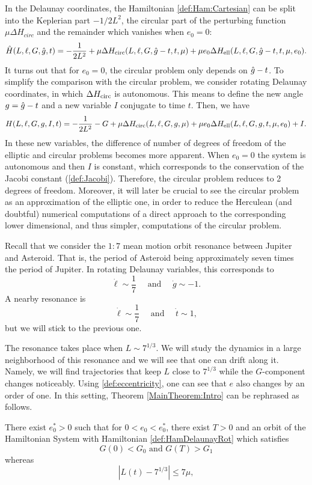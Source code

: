 In the Delaunay coordinates, the Hamiltonian \eqref{def:Ham:Cartesian}
can be split into the Keplerian part $-1/2L^2$, the circular part of
the perturbing function $\mu \Delta H_{circ}$ and the remainder which
vanishes when $e_0=0$:
\begin{equation}\label{def:HamDelaunayNonRot}
  \hat H(L,\ell,G, \hat g,t)=-\frac{1}{2L^2}+\mu\Delta H_{\mathrm{circ}}(L,\ell,G,
  \hat g-t,t,\mu)+ \mu e_0\Delta H_{\mathrm{ell}}(L,\ell,G, \hat g-t,t,\mu,e_0).
\end{equation}
It turns out that for $e_0=0$, the circular problem only depends on
$\hat g-t$. To simplify the comparison with the circular problem, we
consider rotating Delaunay coordinates, in which $\Delta H_{\mathrm{circ}}$ is
autonomous. This means to define the new angle $g=\hat g -t$ and a new
variable $I$ conjugate to time $t$. Then, we have
\begin{equation}\label{def:HamDelaunayRot}
  H(L,\ell,G, g,I,t)=-\frac{1}{2L^2}-G+\mu\Delta H_{\mathrm{circ}}(L,\ell,G, g,\mu)+
  \mu e_0 \Delta H_{\mathrm{ell}}(L,\ell,G, g,t,\mu,e_0)+I.
\end{equation}
In these new variables, the difference of number of degrees of freedom
of the elliptic and circular problems becomes more apparent. When
$e_0=0$ the system is autonomous and then $I$ is constant, which
corresponds to the conservation of the Jacobi constant
(\ref{def:Jacobi}). Therefore, the circular problem reduces to 2
degrees of freedom. Moreover, it will later be crucial to see the
circular problem as an approximation of the elliptic one, in order to
reduce the Herculean (and doubtful) numerical computations of a direct
approach to the corresponding lower dimensional, and thus simpler, computations of the circular
problem.

Recall that we consider the $1:7$ mean motion orbit resonance 
between Jupiter and Asteroid. That is, the period of Asteroid
being approximately seven times the period of Jupiter.
In rotating Delaunay variables, this corresponds to
\begin{equation}\label{def:Resonance}
\dot\ell \sim \frac{1}{7}\quad\text{ and }\quad\dot g\sim -1.
\end{equation}
A nearby resonance is
\[
\dot\ell \sim \frac{1}{7}\quad\text{ and }\quad\dot t\sim 1,
\]
but we will stick to the previous one.

The resonance takes place when $L\sim 7^{1/3}$. We will study 
the dynamics in a large neighborhood of this resonance and 
we will see that one can drift along it. Namely, we will find 
trajectories that keep $L$ close to $7^{1/3}$ while 
the $G$-component changes noticeably. Using \eqref{def:eccentricity}, 
one can see that $e$ also changes by an order of one. 
In this setting, Theorem \ref{MainTheorem:Intro} can be
rephrased as follows.
\begin{theorem}\label{th:MainTheorem:detail}
  There exist $e_0^\ast>0$ such that for $0<e_0<e_0^\ast$, there exist
  $T>0$ and an orbit of the Hamiltonian System with Hamiltonian
  \eqref{def:HamDelaunayRot} which satisfies
  \[
  G(0)<G_0\text{ and }G(T)>G_1
  \]
  whereas
  \[
  \left| L(t)-7^{1/3}\right|\leq 7\mu,
  \]
\end{theorem}

